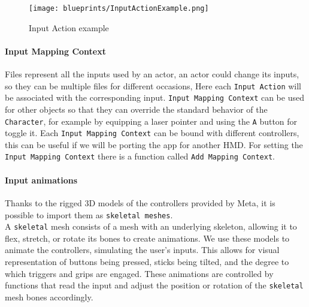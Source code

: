 \begin{figure}[h]
    \centering
    \texttt{[image: blueprints/InputActionExample.png]}
    \caption{Input Action example}
    \label{fig:InputAction}
\end{figure}

\paragraph{Input Mapping Context}
Files represent all the inputs used by an actor, an actor could change its inputs, so they can be multiple files for different occasions,
Here each \texttt{Input Action} will be associated with the corresponding input.
\texttt{Input Mapping Context} can be used for other objects so that they can override the standard behavior of the \texttt{Character}, for example by equipping a laser pointer and using the \texttt{A} button for toggle it.
Each \texttt{Input Mapping Context} can be bound with different controllers, this can be useful if we will be porting the app for another \ac{HMD}.
For setting the \texttt{Input Mapping Context} there is a function called \texttt{Add Mapping Context}.

\paragraph{Input animations}
Thanks to the rigged 3D models of the controllers provided by Meta, it is possible to import them as \texttt{skeletal meshes}.\\
A \texttt{skeletal} mesh consists of a mesh with an underlying skeleton, allowing it to flex, stretch, or rotate its bones to create animations.
We use these models to animate the controllers, simulating the user's inputs. This allows for visual representation of buttons being pressed, sticks being tilted, and the degree to which triggers and grips are engaged.
These animations are controlled by functions that read the input and adjust the position or rotation of the \texttt{skeletal} mesh bones accordingly.


